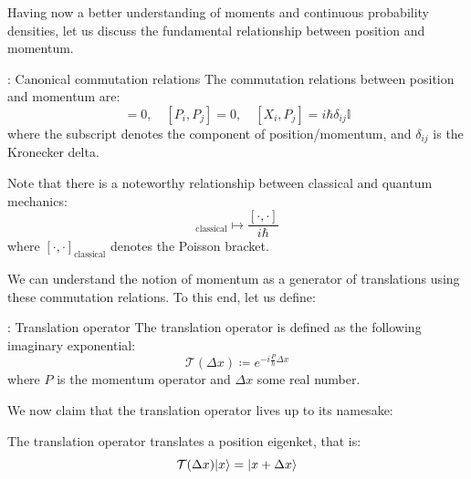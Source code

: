 Having now a better understanding of moments and continuous probability densities, let us discuss the fundamental relationship between position and momentum.

\begin{axiombox}{: Canonical commutation relations}
    The commutation relations between position and momentum are:
    \begin{equation}
        [X_i, X_j] = 0, \quad [P_i, P_j] = 0, \quad [X_i, P_j] = i\hbar\delta_{ij}\mathbb{I}
    \end{equation}
    where the subscript denotes the component of position/momentum, and $\delta_{ij}$ is the Kronecker delta.
\end{axiombox}
Note that there is a noteworthy relationship between classical and quantum mechanics:
\begin{equation}
    [\cdot, \cdot]_{\text{classical}} \mapsto \frac{[\cdot, \cdot]}{i\hbar}
\end{equation}
where $[\cdot, \cdot]_{\text{classical}}$ denotes the Poisson bracket.

We can understand the notion of momentum as a generator of translations using these commutation relations. To this end, let us define:

\begin{defbox}{: Translation operator}
    The translation operator is defined as the following imaginary exponential:
    \begin{equation}
        \mathcal{T}(\Delta x) \coloneqq e^{-i\frac{P}{\hbar}\Delta x}
    \end{equation}
    where $P$ is the momentum operator and $\Delta x$ some real number.
\end{defbox}

We now claim that the translation operator lives up to its namesake:

\begin{propbox}{}
    The translation operator translates a position eigenket, that is:
    \begin{equation}
        \mathcal{T}(\Delta x)\lvert x \rangle = \lvert x + \Delta x \rangle
    \end{equation}
\end{propbox}

